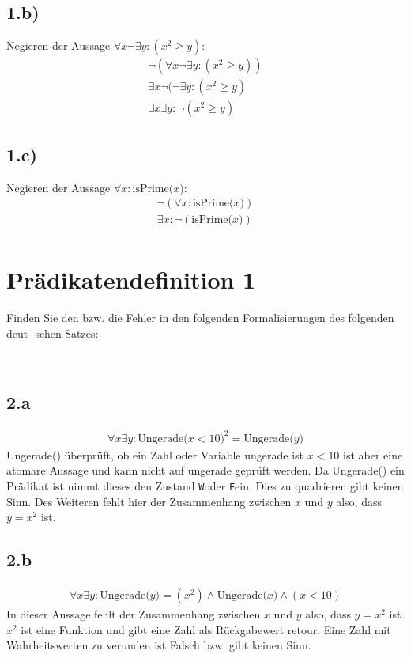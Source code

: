 \documentclass[10pt,ngerman]{scrartcl}
\newcommand{\w }{\texttt{W}}
\newcommand{\f }{\texttt{F}}
\begin{document}
\subsection{1.b)}
Negieren der Aussage $\forall x \neg \exists y : (x^2 \geq y)$:
\setcounter{equation}{0}
\begin{align}
\neg(\forall x \neg \exists y : (x^2 \geq y))\\
\exists x \neg(\neg \exists y : (x^2 \geq y)\\
\exists x \exists y : \neg (x^2 \geq y)
\end{align}
\subsection{1.c)}
Negieren der Aussage $\forall x : \text{isPrime(}x\text{)}$:
\setcounter{equation}{0}
\begin{align}
\neg(\forall x : \text{isPrime(}x\text{)})\\
\exists x :\neg(\text{isPrime(}x\text{)})\\
\end{align}
\pagebreak
\section{Prädikatendefinition 1}
Finden Sie den bzw. die Fehler in den folgenden Formalisierungen des folgenden deut-
schen Satzes:
\setcounter{equation}{0}
\begin{center}
\\
\end{center}
\subsection{2.a}
\setcounter{equation}{0}
\begin{align*}
\forall x \exists y: \text{Ungerade(}x < 10\text{)}^2 = \text{Ungerade(}y\text{)}
\end{align*}
Ungerade() überprüft, ob ein Zahl oder Variable ungerade ist $x<10$ ist aber eine atomare Aussage und kann nicht auf ungerade geprüft werden. Da Ungerade() ein Prädikat ist nimmt dieses den Zustand \w oder \f ein. Dies zu quadrieren gibt keinen Sinn. Des Weiteren fehlt hier der Zusammenhang zwischen $x$ und $y$ also, dass $y = x^2$ ist.
\subsection{2.b}
\setcounter{equation}{0}
\begin{align*}
\forall x \exists y: \text{Ungerade(}y\text{)} = (x^2) \wedge \text{Ungerade(}x\text{)} \wedge (x < 10)
\end{align*}
In dieser Aussage fehlt der Zusammenhang zwischen $x$ und $y$ also, dass $y = x^2$ ist. $x^2$ ist eine Funktion und gibt eine Zahl als Rückgabewert retour. Eine Zahl mit Wahrheitswerten zu \glqq verunden\grqq{}  ist Falsch bzw. gibt keinen Sinn.
\end{document}
